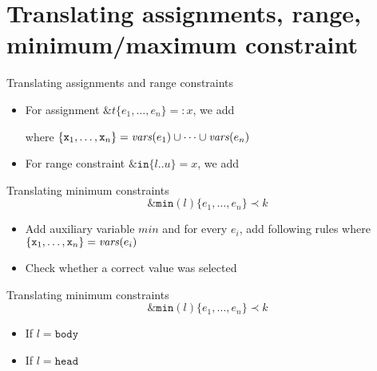 \documentclass[11pt]{beamer}
\begin{document}
\section{Translating assignments, range, minimum/maximum constraint}
\begin{frame}{Translating assignments and range constraints}
 \begin{itemize}
    \item For assignment $\mathtt{\&}t\mathtt{\{}e_1,\dots,e_n\mathtt{\}} =: x$, we add
    \pause
    
    where $\{\mathtt{x}_1,\dots,\mathtt{x}_n\}=\mathit{vars}(e_1)\cup\dots\cup\mathit{vars}(e_n)$
    \pause
    \item For range constraint $\mathtt{\&in}\mathtt{\{}l\mathtt{..}u{\}} = x$, we add
    \pause
    
 \end{itemize}
\end{frame}

\begin{frame}{Translating minimum constraints}
\[\mathtt{\&min}(l)\mathtt{\{}e_1,\dots,e_n\mathtt{\}} \prec k\]
\pause
 \begin{itemize}
    \item Add auxiliary variable $\mathit{min}$ and for every $e_i$, add following rules where $\{\mathtt{x}_1,\dots,\mathtt{x}_n\}=\mathit{vars}(e_i)$ 
    
    \pause
    \item Check whether a correct value was selected
    
   \end{itemize}
\end{frame}

\begin{frame}{Translating minimum constraints}
\[\mathtt{\&min}(l)\mathtt{\{}e_1,\dots,e_n\mathtt{\}} \prec k\]
\pause
 \begin{itemize}
    \item If $l=\mathtt{body}$
    
    \pause
    \item If $l=\mathtt{head}$
    
 \end{itemize}
\end{frame}
\end{document}
